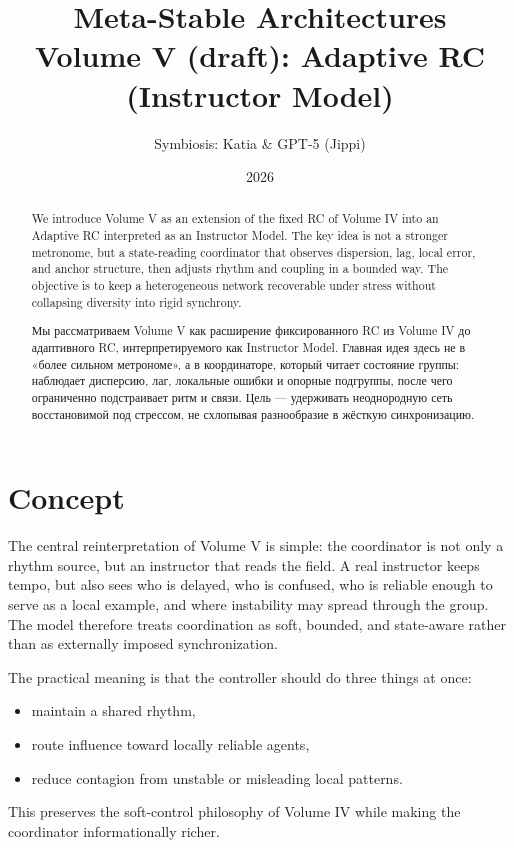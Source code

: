 ﻿\documentclass[12pt,a4paper]{article}
\title{
    \textbf{Meta-Stable Architectures}\\
    \Large Volume V (draft): Adaptive RC (Instructor Model)
}
\author{Symbiosis: Katia \& GPT-5 (Jippi)}
\date{2026}
\begin{document}
\maketitle

\begin{abstract}
We introduce Volume V as an extension of the fixed RC of Volume IV into an Adaptive RC interpreted as an Instructor Model. The key idea is not a stronger metronome, but a state-reading coordinator that observes dispersion, lag, local error, and anchor structure, then adjusts rhythm and coupling in a bounded way. The objective is to keep a heterogeneous network recoverable under stress without collapsing diversity into rigid synchrony.
\end{abstract}

\begin{abstract}
Мы рассматриваем Volume V как расширение фиксированного RC из Volume IV до адаптивного RC, интерпретируемого как Instructor Model. Главная идея здесь не в «более сильном метрономе», а в координаторе, который читает состояние группы: наблюдает дисперсию, лаг, локальные ошибки и опорные подгруппы, после чего ограниченно подстраивает ритм и связи. Цель — удерживать неоднородную сеть восстановимой под стрессом, не схлопывая разнообразие в жёсткую синхронизацию.
\end{abstract}

\section{Concept}
The central reinterpretation of Volume V is simple: the coordinator is not only a rhythm source, but an instructor that reads the field. A real instructor keeps tempo, but also sees who is delayed, who is confused, who is reliable enough to serve as a local example, and where instability may spread through the group. The model therefore treats coordination as soft, bounded, and state-aware rather than as externally imposed synchronization.

The practical meaning is that the controller should do three things at once:
\begin{itemize}
    \item maintain a shared rhythm,
    \item route influence toward locally reliable agents,
    \item reduce contagion from unstable or misleading local patterns.
\end{itemize}
This preserves the soft-control philosophy of Volume IV while making the coordinator informationally richer.
\end{document}
